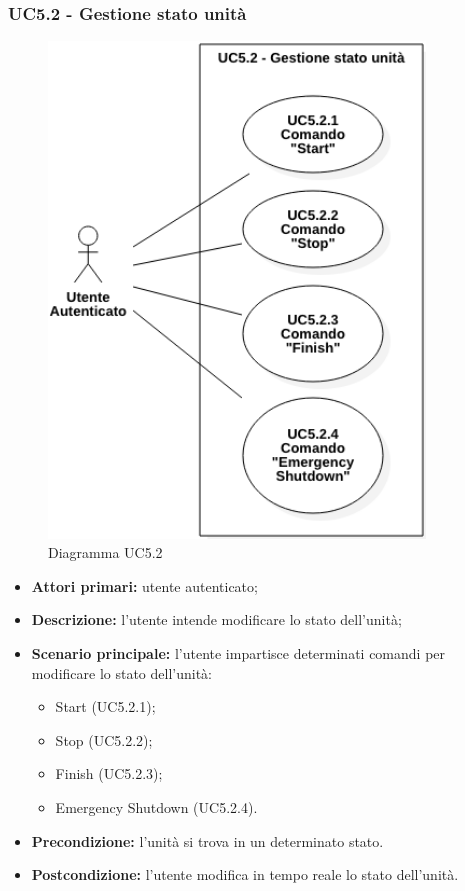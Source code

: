 \subsubsection{UC5.2 - Gestione stato unità}
\begin{figure}[h!]
    \includegraphics[width=10cm]{images/uc5.2.png}
    \caption{Diagramma UC5.2}
\end{figure}
\begin{itemize}
    \item \textbf{Attori primari:} utente autenticato;
    \item \textbf{Descrizione:} l'utente intende modificare lo stato dell'unità;
    \item \textbf{Scenario principale:} l'utente impartisce determinati comandi per modificare lo stato dell'unità:
    \begin{itemize}
        \item Start (UC5.2.1);
        \item Stop (UC5.2.2);
        \item Finish (UC5.2.3);
        \item Emergency Shutdown (UC5.2.4).
    \end{itemize}
    \item \textbf{Precondizione:} l'unità si trova in un determinato stato.
    \item \textbf{Postcondizione:} l'utente modifica in tempo reale lo stato dell'unità.
\end{itemize}


